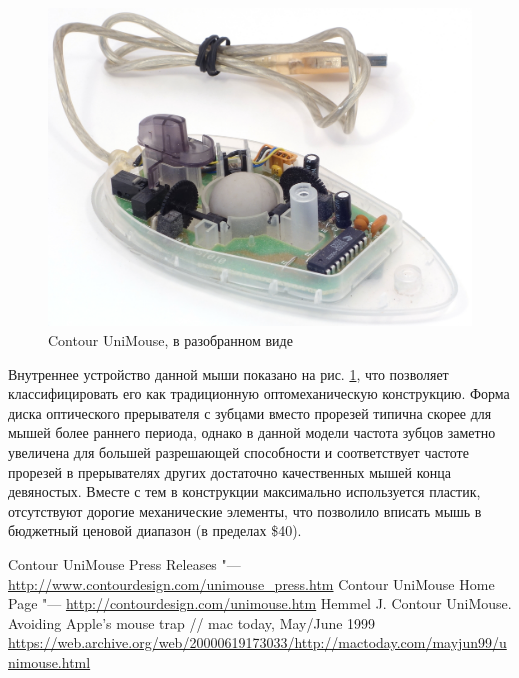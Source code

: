 \documentclass[11pt, a4paper]{article}
\begin{document}
\begin{figure}[h]
    \centering
    \includegraphics[scale=0.7]{1999_contour_unimouse/inside_30.jpg}
    \caption{Contour UniMouse, в разобранном виде}
    \label{fig:ContourUniMouseInside}
\end{figure}

Внутреннее устройство данной мыши показано на рис. \ref{fig:ContourUniMouseInside}, что позволяет классифицировать его как традиционную оптомеханическую конструкцию. Форма диска оптического прерывателя с зубцами вместо прорезей типична скорее для мышей более раннего периода, однако в данной модели частота зубцов заметно увеличена для большей разрешающей способности и соответствует частоте прорезей в прерывателях других достаточно качественных мышей конца девяностых. Вместе с тем в конструкции максимально используется пластик, отсутствуют дорогие механические элементы, что позволило вписать мышь в бюджетный ценовой диапазон (в пределах \$40).

\begin{thebibliography}{9}
     Contour UniMouse Press Releases "--- \url{http://www.contourdesign.com/unimouse_press.htm} 
     Contour UniMouse Home Page "--- \url{http://contourdesign.com/unimouse.htm}
     Hemmel J. Contour UniMouse. Avoiding Apple's mouse trap // mac today, May/June 1999 \url{https://web.archive.org/web/20000619173033/http://mactoday.com/mayjun99/unimouse.html}
\end{thebibliography}
\end{document}
